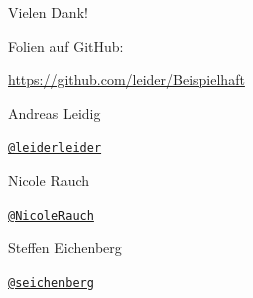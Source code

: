 {
\begin{frame}{Vielen Dank!}

        Folien auf GitHub:
        \vspace{-0.8em}
        \begin{center}
                \url{https://github.com/leider/Beispielhaft}
        \end{center}

        \begin{block}{Andreas Leidig}
        \begin{description}[Twitterxx]
                \item[Twitter] \href{http://twitter.com/leiderleider}{\texttt{@leiderleider}}
        \end{description}
        \end{block}

        \begin{block}{Nicole Rauch}
        \begin{description}[Twitterxx]
                \item[Twitter] \href{http://twitter.com/NicoleRauch}{\texttt{@NicoleRauch}}
        \end{description}
        \end{block}

        \begin{block}{Steffen Eichenberg}
        \begin{description}[Twitterxx]
                \item[Twitter] \href{http://twitter.com/seichenberg}{\texttt{@seichenberg}}
        \end{description}
        \end{block}
\end{frame}
}
